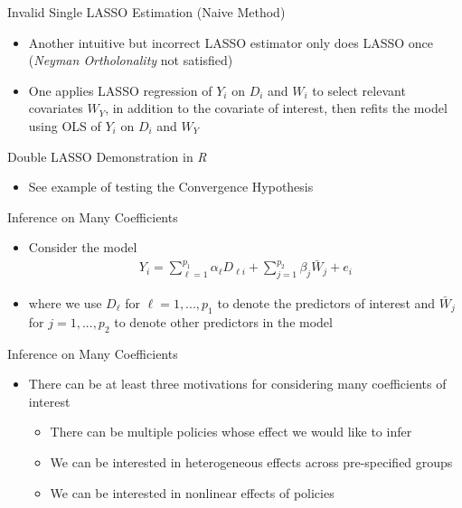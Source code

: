 \documentclass[aspectratio=1610,12pt,xcolor=dvipsnames]{beamer}
\begin{document}
\begin{frame}{Invalid Single LASSO Estimation (Naive Method)}

\begin{itemize}
    \item Another intuitive but incorrect LASSO estimator only does LASSO once (\textit{Neyman Ortholonality} not satisfied)
    \item One applies LASSO regression of $Y_i$ on $D_i$ and $W_i$ to select relevant covariates $W_Y$, in addition to the covariate of interest, then refits the model using OLS of $Y_i$ on $D_i$ and $W_Y$
\end{itemize}
\end{frame}

\begin{frame}{Double LASSO Demonstration in \textit{R}}

\begin{itemize}
    \item See example of testing the Convergence Hypothesis
\end{itemize}
    
\end{frame}

\begin{frame}{Inference on Many Coefficients}

\begin{itemize}
    \item Consider the model
    \begin{align*}
        Y_i = \sum_{\ell=1}^{p_1} \alpha_{\ell}D_{\ell i} + \sum_{j=1}^{p_2} \beta_j \bar W_j + e_i
    \end{align*}
    \item where we use $D_{\ell}$ for $\ell = 1,...,p_1$ to denote the predictors of interest and $\bar W_{j}$ for $j = 1,...,p_2$ to denote other predictors in the model
\end{itemize}
\end{frame}

\begin{frame}{Inference on Many Coefficients}

\begin{itemize}
    \item There can be at least three motivations for considering many coefficients of interest
    \begin{itemize}
        \item There can be multiple policies whose effect we would like to infer
        \item We can be interested in heterogeneous effects across pre-specified groups
        \item We can be interested in nonlinear effects of policies
    \end{itemize}
\end{itemize}
\end{frame}
\end{document}
